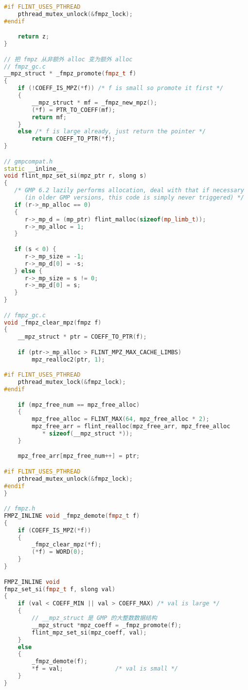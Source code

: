 \begin{lstlisting}[language=cpp]
#if FLINT_USES_PTHREAD
    pthread_mutex_unlock(&fmpz_lock);
#endif

    return z;
}

// 把 fmpz 从非额外 alloc 变为额外 alloc
// fmpz_gc.c
__mpz_struct * _fmpz_promote(fmpz_t f)
{
    if (!COEFF_IS_MPZ(*f)) /* f is small so promote it first */
    {
        __mpz_struct * mf = _fmpz_new_mpz();
        (*f) = PTR_TO_COEFF(mf);
        return mf;
    }
    else /* f is large already, just return the pointer */
        return COEFF_TO_PTR(*f);
}

// gmpcompat.h
static __inline__
void flint_mpz_set_si(mpz_ptr r, slong s)
{
   /* GMP 6.2 lazily performs allocation, deal with that if necessary
      (in older GMP versions, this code is simply never triggered) */
   if (r->_mp_alloc == 0)
   {
      r->_mp_d = (mp_ptr) flint_malloc(sizeof(mp_limb_t));
      r->_mp_alloc = 1;
   }

   if (s < 0) {
      r->_mp_size = -1;
      r->_mp_d[0] = -s;
   } else {
      r->_mp_size = s != 0;
      r->_mp_d[0] = s;
   }
}

// fmpz_gc.c
void _fmpz_clear_mpz(fmpz f)
{
    __mpz_struct * ptr = COEFF_TO_PTR(f);

    if (ptr->_mp_alloc > FLINT_MPZ_MAX_CACHE_LIMBS)
        mpz_realloc2(ptr, 1);

#if FLINT_USES_PTHREAD
    pthread_mutex_lock(&fmpz_lock);
#endif

    if (mpz_free_num == mpz_free_alloc)
    {
        mpz_free_alloc = FLINT_MAX(64, mpz_free_alloc * 2);
        mpz_free_arr = flint_realloc(mpz_free_arr, mpz_free_alloc
           * sizeof(__mpz_struct *));
    }

    mpz_free_arr[mpz_free_num++] = ptr;

#if FLINT_USES_PTHREAD
    pthread_mutex_unlock(&fmpz_lock);
#endif
}

// fmpz.h
FMPZ_INLINE void _fmpz_demote(fmpz_t f)
{
    if (COEFF_IS_MPZ(*f)) 
    {
        _fmpz_clear_mpz(*f);
        (*f) = WORD(0);
    }
}

FMPZ_INLINE void
fmpz_set_si(fmpz_t f, slong val)
{
    if (val < COEFF_MIN || val > COEFF_MAX) /* val is large */
    {
        // __mpz_struct 是 GMP 的大整数数据结构
        __mpz_struct *mpz_coeff = _fmpz_promote(f);
        flint_mpz_set_si(mpz_coeff, val);
    }
    else
    {
        _fmpz_demote(f);
        *f = val;               /* val is small */
    }
}
\end{lstlisting}
